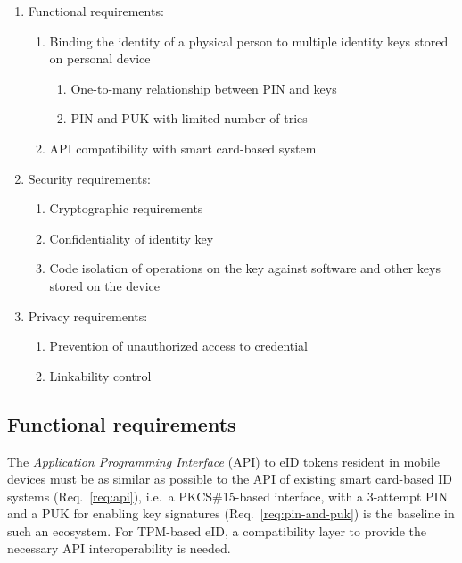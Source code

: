 \documentclass{sig-alternate-2013}
\begin{document}
\begin{center}
\begin{enumerate}
  \item \label{req:functional-requirements} Functional requirements:
  \begin{enumerate}
    \item \label{req:identity-binding} Binding the identity of a physical person to
    multiple identity keys stored on personal device
    \begin{enumerate}
      \item \label{req:one-to-many} One-to-many relationship between PIN and keys
      \item \label{req:pin-and-puk} PIN and PUK with limited number of tries
    \end{enumerate}
    \item \label{req:api} API compatibility with smart card-based system
  \end{enumerate}
  \item \label{req:security-requirements} Security requirements:
    \begin{enumerate}
      \item \label{req:cryptograpy} Cryptographic requirements
      \item \label{req:confidentiality} Confidentiality of identity key
      \item \label{req:isolation} Code isolation of operations on the key
      against software and other keys stored on the device
    \end{enumerate}
  \item \label{req:privacy-requirements} Privacy requirements:
  \begin{enumerate}
    \item \label{req:authorization} Prevention of unauthorized access to credential
    \item \label{req:linkability} Linkability control
  \end{enumerate}
\end{enumerate}
\end{center}

\subsection{Functional requirements}

The \emph{Application Programming Interface} (API) to eID tokens resident in
mobile devices must be as similar as possible to the API of existing smart
card-based ID systems (Req.~\ref{req:api}), i.e.\ a PKCS\#15-based interface,
with a 3-attempt PIN and a PUK for enabling key signatures
(Req.~\ref{req:pin-and-puk}) is the baseline in such an ecosystem. For TPM-based
eID, a compatibility layer to provide the necessary API interoperability is
needed.
\end{document}
